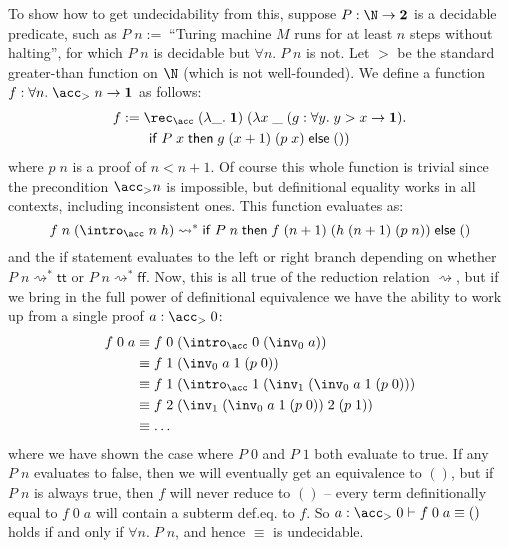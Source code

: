To show how to get undecidability from this, suppose $P:\N\to\bf 2$ is a decidable predicate, such as $P\;n:=\;$``Turing machine $M$ runs for at least $n$ steps without halting'', for which $P\;n$ is decidable but $\forall n.\;P\;n$ is not. Let $>$ be the standard greater-than function on $\N$ (which is not well-founded). We define a function $f:\forall n.\;\acc_{>}\;n\to\bf 1$ as follows:
\begin{align*}
f&:=\rec_{\acc}\;(\lambda\_.\;{\bf 1})\;(\lambda x\;\_\;(g:\forall y.\;y>x\to{\bf 1}).\\
&\qquad\mathsf{if}\;P\;x\;\mathsf{then}\;g\;(x+1)\;(p\;x)\;\mathsf{else}\;())
\end{align*}
where $p\;n$ is a proof of $n<n+1$. Of course this whole function is trivial since the precondition $\acc_{>}n$ is impossible, but definitional equality works in all contexts, including inconsistent ones. This function evaluates as:
$$f\;n\;(\intro_\acc\;n\;h)\rightsquigarrow^*\mathsf{if}\;P\;n\;\mathsf{then}\;f\;(n+1)\;(h\;(n+1)\;(p\;n))\;\mathsf{else}\;()$$
and the \textsf{if} statement evaluates to the left or right branch depending on whether $P\;n\rightsquigarrow^*\mathsf{tt}$ or $P\;n\rightsquigarrow^*\mathsf{ff}$. Now, this is all true of the reduction relation $\rightsquigarrow$, but if we bring in the full power of definitional equivalence we have the ability to work up from a single proof $a:\acc_{>}\;0$:
\begin{align*}
f\;0\;a&\equiv f\;0\;(\intro_\acc\;0\;(\inv_0\;a))\\
&\equiv f\;1\;(\inv_0\;a\;1\;(p\;0))\\
&\equiv f\;1\;(\intro_\acc\;1\;(\inv_1\;(\inv_0\;a\;1\;(p\;0)))\\
&\equiv f\;2\;(\inv_1\;(\inv_0\;a\;1\;(p\;0))\;2\;(p\;1))\\
&\equiv\dots
\end{align*}
where we have shown the case where $P\;0$ and $P\;1$ both evaluate to true. If any $P\;n$ evaluates to false, then we will eventually get an equivalence to $()$, but if $P\;n$ is always true, then $f$ will never reduce to $()$ -- every term definitionally equal to $f\;0\;a$ will contain a subterm def.eq. to $f$. So $a:\acc_{>}\;0\vdash f\;0\;a\equiv()$ holds if and only if $\forall n.\;P\;n$, and hence $\equiv$ is undecidable.

